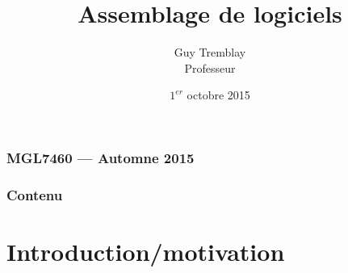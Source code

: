 

\newcommand{\BAC}[1]{#1}
\newcommand{\MAITRISE}[1]{}
\renewcommand{\BAC}[1]{}
\renewcommand{\MAITRISE}{}


\author[Guy Tremblay, D\'epartement d'informatique]
{Guy Tremblay\\Professeur}




\date{$1^{er}$ octobre 2015}



\title{Assemblage de logiciels}


\begin{frame}
\frametitle{MGL7460 --- Automne 2015}

  \titlepage

\NOTE{\ }
\end{frame}

\begin{frame}
\frametitle{Contenu}

\large

\tableofcontents


\NOTE{\ }

\end{frame}




\section{Introduction/motivation}

